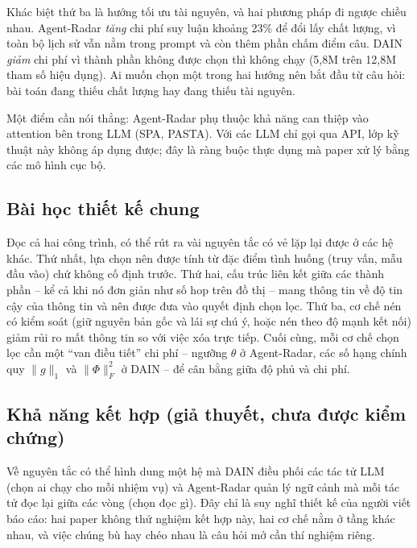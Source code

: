 Khác biệt thứ ba là hướng tối ưu tài nguyên, và hai phương pháp đi ngược chiều nhau. Agent-Radar \emph{tăng} chi phí suy luận khoảng 23\% để đổi lấy chất lượng, vì toàn bộ lịch sử vẫn nằm trong prompt và còn thêm phần chấm điểm câu. DAIN \emph{giảm} chi phí vì thành phần không được chọn thì không chạy (5,8M trên 12,8M tham số hiệu dụng). Ai muốn chọn một trong hai hướng nên bắt đầu từ câu hỏi: bài toán đang thiếu chất lượng hay đang thiếu tài nguyên.

Một điểm cần nói thẳng: Agent-Radar phụ thuộc khả năng can thiệp vào attention bên trong LLM (SPA, PASTA). Với các LLM chỉ gọi qua API, lớp kỹ thuật này không áp dụng được; đây là ràng buộc thực dụng mà paper xử lý bằng các mô hình cục bộ.

\subsection{Bài học thiết kế chung}
Đọc cả hai công trình, có thể rút ra vài nguyên tắc có vẻ lặp lại được ở các hệ khác. Thứ nhất, lựa chọn nên được tính từ đặc điểm tình huống (truy vấn, mẫu đầu vào) chứ không cố định trước. Thứ hai, cấu trúc liên kết giữa các thành phần -- kể cả khi nó đơn giản như số hop trên đồ thị -- mang thông tin về độ tin cậy của thông tin và nên được đưa vào quyết định chọn lọc. Thứ ba, cơ chế nén có kiểm soát (giữ nguyên bản gốc và lái sự chú ý, hoặc nén theo độ mạnh kết nối) giảm rủi ro mất thông tin so với việc xóa trực tiếp. Cuối cùng, mỗi cơ chế chọn lọc cần một ``van điều tiết'' chi phí -- ngưỡng $\theta$ ở Agent-Radar, các số hạng chính quy $\|g\|_1$ và $\|\Phi\|_F^2$ ở DAIN -- để cân bằng giữa độ phủ và chi phí.

\subsection{Khả năng kết hợp (giả thuyết, chưa được kiểm chứng)}
Về nguyên tắc có thể hình dung một hệ mà DAIN điều phối các tác tử LLM (chọn ai chạy cho mỗi nhiệm vụ) và Agent-Radar quản lý ngữ cảnh mà mỗi tác tử đọc lại giữa các vòng (chọn đọc gì). Đây chỉ là suy nghĩ thiết kế của người viết báo cáo: hai paper không thử nghiệm kết hợp này, hai cơ chế nằm ở tầng khác nhau, và việc chúng bù hay chéo nhau là câu hỏi mở cần thí nghiệm riêng.
